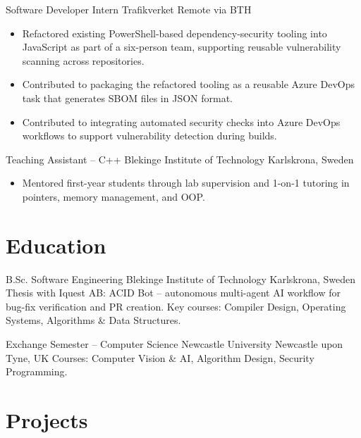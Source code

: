\documentclass[11pt,a4paper,sans]{moderncv}
\begin{document}
{Software Developer Intern}
{Trafikverket}
{Remote via BTH}
{}
{
\begin{itemize}
\item Refactored existing PowerShell-based dependency-security tooling into JavaScript as part of a six-person team, supporting reusable vulnerability scanning across repositories.
\item Contributed to packaging the refactored tooling as a reusable Azure DevOps task that generates SBOM files in JSON format.
\item Contributed to integrating automated security checks into Azure DevOps workflows to support vulnerability detection during builds.
\end{itemize}
}

{Teaching Assistant -- C++}
{Blekinge Institute of Technology}
{Karlskrona, Sweden}
{}
{
\begin{itemize}
\item Mentored first-year students through lab supervision and 1-on-1 tutoring in pointers, memory management, and OOP.
\end{itemize}
}

\vspace{-0.6em}
\section{Education}

{B.Sc. Software Engineering}
{Blekinge Institute of Technology}
{Karlskrona, Sweden}
{}
{Thesis with Iquest AB: ACID Bot -- autonomous multi-agent AI workflow for bug-fix verification and PR creation. Key courses: Compiler Design, Operating Systems, Algorithms \& Data Structures.}

{Exchange Semester -- Computer Science}
{Newcastle University}
{Newcastle upon Tyne, UK}
{}
{Courses: Computer Vision \& AI, Algorithm Design, Security Programming.}

\vspace{-0.6em}
\section{Projects}


\end{document}
